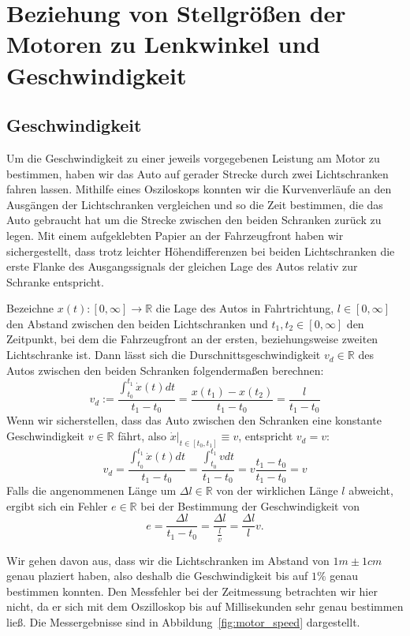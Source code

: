 \section{Beziehung von Stellgrößen der Motoren zu Lenkwinkel und Geschwindigkeit}
\subsection{Geschwindigkeit}
Um die Geschwindigkeit zu einer jeweils vorgegebenen Leistung am Motor zu bestimmen, haben wir das Auto auf gerader Strecke durch zwei Lichtschranken fahren lassen. Mithilfe eines Osziloskops konnten wir die Kurvenverläufe an den Ausgängen der Lichtschranken vergleichen und so die Zeit bestimmen, die das Auto gebraucht hat um die Strecke zwischen den beiden Schranken zurück zu legen. Mit einem aufgeklebten Papier an der Fahrzeugfront haben wir sichergestellt, dass trotz leichter Höhendifferenzen bei beiden Lichtschranken die erste Flanke des Ausgangssignals der gleichen Lage des Autos relativ zur Schranke entspricht.

Bezeichne $x(t): [0,\infty]\rightarrow \mathbb{R}$ die Lage des Autos in Fahrtrichtung, $l\in[0,\infty]$ den Abstand zwischen den beiden Lichtschranken und $t_1, t_2\in [0,\infty]$ den Zeitpunkt, bei dem die Fahrzeugfront an der ersten, beziehungsweise zweiten Lichtschranke ist. Dann lässt sich die Durschnittsgeschwindigkeit $v_d\in\mathbb{R}$ des Autos zwischen den beiden Schranken folgendermaßen berechnen:
\begin{equation*}
v_d := \frac{\int_{t_0}^{t_1}{\dot x(t) dt}}{t_1-t_0}=\frac{x(t_1)-x(t_2)}{t_1-t_0}=\frac{l}{t_1-t_0}
\end{equation*}
Wenn wir sicherstellen, dass das Auto zwischen den Schranken eine konstante Geschwindigkeit $v\in\mathbb{R}$ fährt, also $\dot x\vert_{t\in[t_0,t_1]}\equiv v$, entspricht $v_d=v$:
\begin{equation*}
v_d = \frac{\int_{t_0}^{t_1}{\dot x(t) dt}}{t_1-t_0} = \frac{\int_{t_0}^{t_1}{v dt}}{t_1-t_0}=v\frac{t_1-t_0}{t_1-t_0}=v
\end{equation*}
Falls die angenommenen Länge um $\Delta l\in\mathbb{R}$ von der wirklichen Länge $l$ abweicht, ergibt sich ein Fehler $e\in \mathbb{R}$ bei der Bestimmung der Geschwindigkeit von
\begin{equation*}
	e = \frac{\Delta l}{t_1-t_0} = \frac{\Delta l}{\frac{l}{v}} = \frac{\Delta l}{l}v.
\end{equation*}

Wir gehen davon aus, dass wir die Lichtschranken im Abstand von $1m\pm1cm$ genau plaziert haben, also deshalb die Geschwindigkeit bis auf $1\%$ genau bestimmen konnten. Den Messfehler bei der Zeitmessung betrachten wir hier nicht, da er sich mit dem Oszilloskop bis auf Millisekunden sehr genau bestimmen ließ. Die Messergebnisse sind in Abbildung~\ref{fig:motor_speed} dargestellt.

